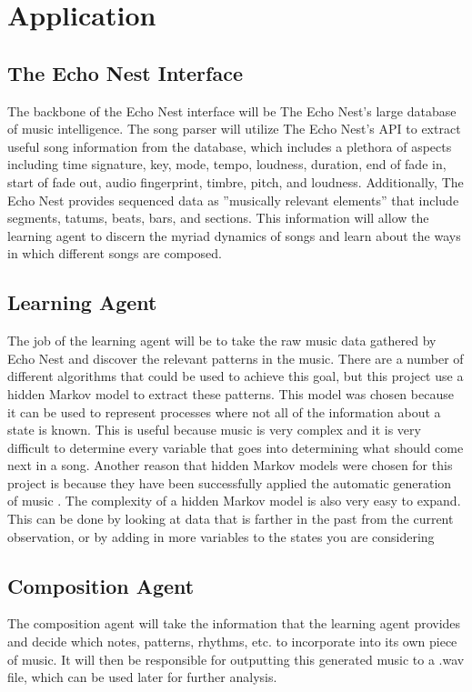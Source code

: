 \documentclass{article}
\begin{document}
\section{Application}
\subsection{The Echo Nest Interface}
The backbone of the Echo Nest interface will be The Echo Nest’s large database of music intelligence. The
song parser will utilize The Echo Nest’s API to extract useful song information from the database, which
includes a plethora of aspects including time signature, key, mode, tempo, loudness, duration, end of fade
in, start of fade out, audio fingerprint, timbre, pitch, and loudness. Additionally, The Echo Nest provides
sequenced data as ”musically relevant elements” that include segments, tatums, beats, bars, and sections.
This information will allow the learning agent to discern the myriad dynamics of songs and learn about the
ways in which different songs are composed.

\subsection{Learning Agent}
The job of the learning agent will be to take the raw music data gathered by Echo Nest and discover the
relevant patterns in the music. There are a number of different algorithms that could be used to achieve this
goal, but this project use a hidden Markov model to extract these patterns. This model was chosen because
it can be used to represent processes where not all of the information about a state is known. This is useful
because music is very complex and it is very difficult to determine every variable that goes into determining
what should come next in a song. Another reason that hidden Markov models were chosen for this project
is because they have been successfully applied the automatic generation of music \cite{SOMETHING GOES HERE}. The complexity of a
hidden Markov model is also very easy to expand. This can be done by looking at data that is farther in
the past from the current observation, or by adding in more variables to the states you are considering

\subsection{Composition Agent}
The composition agent will take the information that the learning agent provides and decide which notes,
patterns, rhythms, etc. to incorporate into its own piece of music. It will then be responsible for outputting
this generated music to a .wav file, which can be used later for further analysis.
\end{document}
